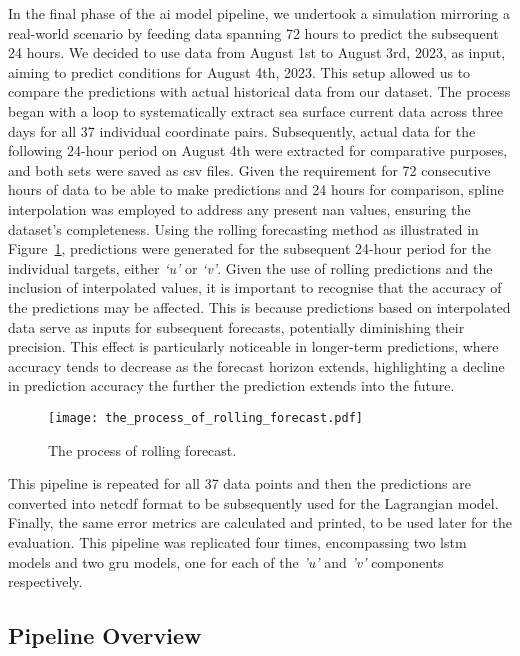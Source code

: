In the final phase of the \acrshort{ai} model pipeline, we undertook a simulation mirroring a real-world scenario by feeding data spanning 72 hours to predict the subsequent 24 hours. We decided to use data from August 1st to August 3rd, 2023, as input, aiming to predict conditions for August 4th, 2023. This setup allowed us to compare the predictions with actual historical data from our dataset. The process began with a loop to systematically extract sea surface current data across three days for all 37 individual coordinate pairs. Subsequently, actual data for the following 24-hour period on August 4th were extracted for comparative purposes, and both sets were saved as \acrshort{csv} files. Given the requirement for 72 consecutive hours of data to be able to make predictions and 24 hours for comparison, spline interpolation was employed to address any present \acrshort{nan} values, ensuring the dataset's completeness. Using the rolling forecasting method as illustrated in Figure~\ref{fig_3.7}, predictions were generated for the subsequent 24-hour period for the individual targets, either \textit{‘u’} or \textit{‘v’}. Given the use of rolling predictions and the inclusion of interpolated values, it is important to recognise that the accuracy of the predictions may be affected. This is because predictions based on interpolated data serve as inputs for subsequent forecasts, potentially diminishing their precision. This effect is particularly noticeable in longer-term predictions, where accuracy tends to decrease as the forecast horizon extends, highlighting a decline in prediction accuracy the further the prediction extends into the future.

\begin{figure}[htbp]
    \centering
    \texttt{[image: the\_process\_of\_rolling\_forecast.pdf]}
    \caption[Short sample caption.]{The process of rolling forecast.\label{fig_3.7}}
\end{figure}

This pipeline is repeated for all 37 data points and then the predictions are converted into \acrshort{netcdf} format to be subsequently used for the Lagrangian model. Finally, the same error metrics are calculated and printed, to be used later for the evaluation. This pipeline was replicated four times, encompassing two \acrshort{lstm} models and two \acrshort{gru} models, one for each of the \textit{'u'} and \textit{'v'} components respectively.

\subsection{Pipeline Overview}
\label{subsec:3.3.4}

